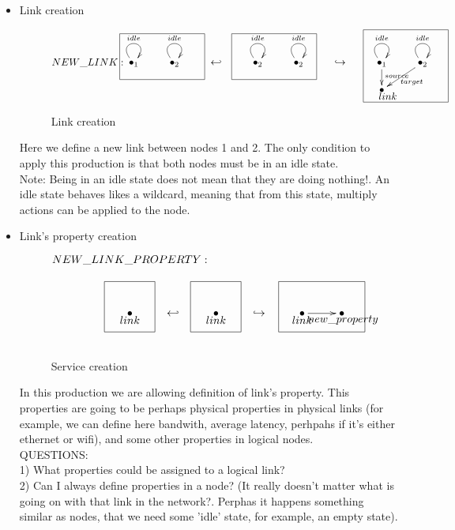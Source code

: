\documentclass[envcountsect,runningheads]{llncs}
\begin{document}
\begin{itemize}
  \item Link creation
  \begin{figure}[H]
    \[
       \xymatrix@C=25pt@R=16pt
       {
        {\bullet}_{1}\ar@(ul,ur)^{idle} \POS[]-<3.8pc,0pc>\drop{NEW\_LINK:}
         \POS[]-<.4pc,-0.5pc> &
         {\bullet}_{2}\ar@(ul,ur)^{idle}
         \POS[]+<.4pc,0pc>
         \POS[]-<1pc,-0.5pc>*+=<7pc,3.8pc>[F-]{} & {\hookleftarrow} &
         {\bullet}_{2}\ar@(ul,ur)^{idle} 
         \POS[]-<.4pc,-0.5pc> &
         {\bullet}_{2}\ar@(ul,ur)^{idle}
         \POS[]+<.4pc,-0.5pc>
         \POS[]-<2pc,-0.5pc>*+=<7pc,3.8pc>[F-]{} & {\hookrightarrow} 
         \POS[]+<4.6pc,0.5pc> *+=<7pc,3.8pc>[]{} &
         {\bullet}_{1}\ar@(ul,ur)^{idle}\ar@{->}[d]^{source}
         \POS[]+<0pc,.5pc> &
         {\bullet}_{2} \ar@(ul,ur)^{idle}\ar@{->}[dl]^{target}
         \\
         & & & & & & {\bullet} \POS[]+<2pc,2pc>*+=<7pc,6pc>[F-]{} \POS[]-<-0.5pc,.5pc>\drop{link}
       }
    \]
    \caption{Link creation}
    \protect\label{fig:linkcreation}
  \end{figure}
  Here we define a new link between nodes 1 and 2. The only condition to apply 
  this production is that both nodes must be in an idle state.\\
  Note: Being in an idle state does not mean that they are doing nothing!. An 
  idle state behaves likes a wildcard, meaning that from this state, multiply actions 
  can be applied to the node.\\
  
  \item Link's property creation
  \begin{figure}[H]
    \[
       \xymatrix@C=25pt@R=16pt
       {
         {}\POS[]+<0pc,2pc>\drop{NEW\_LINK\_PROPERTY:}
         \\
         {\bullet}\POS[]-<0pc,.5pc>\drop{link}
         \POS[]+<0pc,.5pc> *+=<3.8pc,3.8pc>[F-]{} 
         & {\hookleftarrow} &
         {\bullet}\POS[]-<0pc,.5pc>\drop{link}
         \POS[]+<0pc,.5pc> *+=<3.8pc,3.8pc>[F-]{} & {\hookrightarrow} &
         {\bullet}\ar@{->}[r]\POS[]-<0pc,.5pc>\drop{link}
         \POS[]+<1.5pc,.5pc> *+=<6.5pc,3.8pc>[F-]{} &
         {\bullet}
         \POS[]-<-.1pc,.5pc>*+=<4pc,4pc>[]{}\drop{new\_property}
       }
    \]
    \caption{Service creation}
    \protect\label{fig:servicecreation}
  \end{figure}
  In this production we are allowing definition of link's property. This properties are going to be 
  perhaps physical properties in physical links (for example, we can define here bandwith, 
  average latency, perhpahs if it's either ethernet or wifi), and some other properties in logical 
  nodes.\\
  QUESTIONS:\\
  1) What properties could be assigned to a logical link? \\
  2) Can I always define properties in a node? (It really doesn't matter what is going on with 
  that link in the network?. Perphas it happens something similar as nodes, that we need some 
  'idle' state, for example, an empty state).\\
  
  \end{itemize}
  
\end{document}

